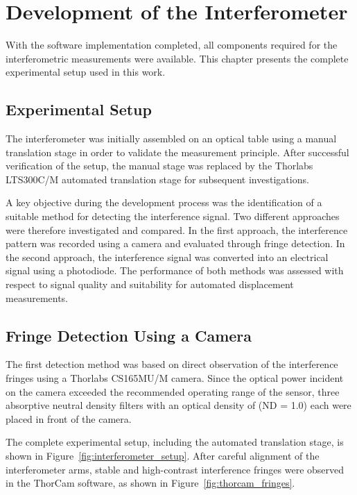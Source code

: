 \chapter{Development of the Interferometer}
\thispagestyle{empty}
With the software implementation completed, all components required for the interferometric measurements were available. This chapter presents the complete experimental setup used in this work.

\section{Experimental Setup}

The interferometer was initially assembled on an optical table using a manual translation stage in order to validate the measurement principle. After successful verification of the setup, the manual stage was replaced by the Thorlabs LTS300C/M automated translation stage for subsequent investigations.

A key objective during the development process was the identification of a suitable method for detecting the interference signal. Two different approaches were therefore investigated and compared. In the first approach, the interference pattern was recorded using a camera and evaluated through fringe detection. In the second approach, the interference signal was converted into an electrical signal using a photodiode. The performance of both methods was assessed with respect to signal quality and suitability for automated displacement measurements.

\section{Fringe Detection Using a Camera}

The first detection method was based on direct observation of the interference fringes using a Thorlabs CS165MU/M camera. Since the optical power incident on the camera exceeded the recommended operating range of the sensor, three absorptive neutral density filters with an optical density of (ND = 1.0) each were placed in front of the camera.

The complete experimental setup, including the automated translation stage, is shown in Figure~\ref{fig:interferometer_setup}. After careful alignment of the interferometer arms, stable and high-contrast interference fringes were observed in the ThorCam software, as shown in Figure~\ref{fig:thorcam_fringes}.

